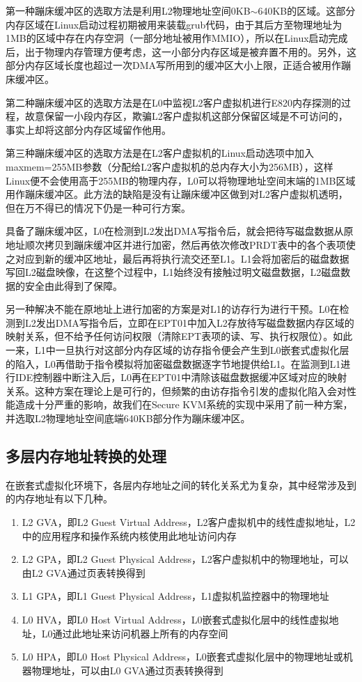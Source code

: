 第一种蹦床缓冲区的选取方法是利用L2物理地址空间0KB$\sim$640KB的区域。这部分内存区域在Linux启动过程初期被用来装载grub代码，由于其后方至物理地址为1MB的区域中存在内存空洞（一部分地址被用作MMIO），所以在Linux启动完成后，出于物理内存管理方便考虑，这一小部分内存区域是被弃置不用的。另外，这部分内存区域长度也超过一次DMA写所用到的缓冲区大小上限，正适合被用作蹦床缓冲区。

第二种蹦床缓冲区的选取方法是在L0中监视L2客户虚拟机进行E820内存探测的过程\cite{e820}，故意保留一小段内存区，欺骗L2客户虚拟机这部分保留区域是不可访问的，事实上却将这部分内存区域留作他用。

第三种蹦床缓冲区的选取方法是在L2客户虚拟机的Linux启动选项中加入maxmem=255MB参数（分配给L2客户虚拟机的总内存大小为256MB），这样Linux便不会使用高于255MB的物理内存，L0可以将物理地址空间末端的1MB区域用作蹦床缓冲区。此方法的缺陷是没有让蹦床缓冲区做到对L2客户虚拟机透明，但在万不得已的情况下仍是一种可行方案。

具备了蹦床缓冲区，L0在检测到L2发出DMA写指令后，就会把待写磁盘数据从原地址顺次拷贝到蹦床缓冲区并进行加密，然后再依次修改PRDT表中的各个表项使之对应到新的缓冲区地址，最后再将执行流交还至L1。L1会将加密后的磁盘数据写回L2磁盘映像，在这整个过程中，L1始终没有接触过明文磁盘数据，L2磁盘数据的安全由此得到了保障。

另一种解决不能在原地址上进行加密的方案是对L1的访存行为进行干预。L0在检测到L2发出DMA写指令后，立即在EPT01中加入L2存放待写磁盘数据内存区域的映射关系，但不给予任何访问权限（清除EPT表项的读、写、执行权限位）。如此一来，L1中一旦执行对这部分内存区域的访存指令便会产生到L0嵌套式虚拟化层的陷入，L0再借助于指令模拟将加密磁盘数据逐字节地提供给L1。在监测到L1进行IDE控制器中断注入后，L0再在EPT01中清除该磁盘数据缓冲区域对应的映射关系。这种方案在理论上是可行的，但频繁的由访存指令引发的虚拟化陷入会对性能造成十分严重的影响，故我们在Secure KVM系统的实现中采用了前一种方案，并选取L2物理地址空间底端640KB部分作为蹦床缓冲区。

\subsection{多层内存地址转换的处理}

在嵌套式虚拟化环境下，各层内存地址之间的转化关系尤为复杂，其中经常涉及到的内存地址有以下几种。

\begin{enumerate}
\item L2 GVA，即L2 Guest Virtual Address，L2客户虚拟机中的线性虚拟地址，L2中的应用程序和操作系统内核使用此地址访问内存
\item L2 GPA，即L2 Guest Physical Address，L2客户虚拟机中的物理地址，可以由L2 GVA通过页表转换得到
\item L1 GPA，即L1 Guest Physical Address，L1虚拟机监控器中的物理地址
\item L0 HVA，即L0 Host Virtual Address，L0嵌套式虚拟化层中的线性虚拟地址，L0通过此地址来访问机器上所有的内存空间
\item L0 HPA，即L0 Host Physical Address，L0嵌套式虚拟化层中的物理地址或机器物理地址，可以由L0 GVA通过页表转换得到
\end{enumerate}

